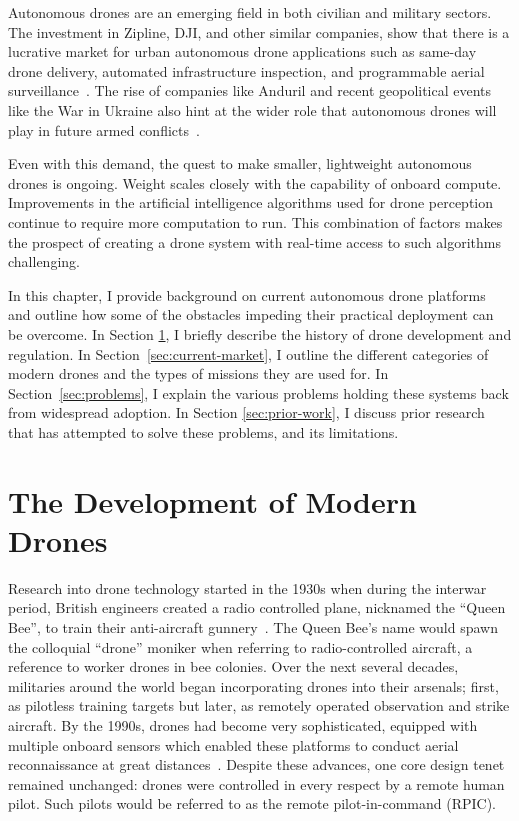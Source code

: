 Autonomous drones are an emerging field in both civilian and military sectors. The investment in Zipline, DJI, and other similar companies, show that there is a lucrative market for urban autonomous drone applications such as same-day drone delivery, automated infrastructure inspection, and programmable aerial surveillance~\cite{GrandviewResearchDroneMarket,ForbesZiplineEvaluation}. The rise of companies like Anduril and recent geopolitical events like the War in Ukraine also hint at the wider role that autonomous drones will play in future armed conflicts~\cite{CNBC,CFAS}.

Even with this demand, the quest to make smaller, lightweight autonomous drones is ongoing. Weight scales closely with the capability of onboard compute. Improvements in the artificial intelligence algorithms used for drone perception continue to require more computation to run. This combination of factors makes the prospect of creating a drone system with real-time access to such algorithms challenging.

In this chapter, I provide background on current autonomous drone platforms and outline how some of the obstacles impeding their practical deployment can be overcome. In Section \ref{sec:history-drone-development}, I briefly describe the history of drone development and regulation. In Section~\ref{sec:current-market}, I outline the different categories of modern drones and the types of missions they are used for. In Section~\ref{sec:problems}, I explain the various problems holding these systems back from widespread adoption. In Section \ref{sec:prior-work}, I discuss prior research that has attempted to solve these problems, and its limitations.

\section{The Development of Modern Drones}
\label{sec:history-drone-development}

Research into drone technology started in the 1930s when during the interwar period, British engineers created a radio controlled plane, nicknamed the ``Queen Bee'', to train their anti-aircraft gunnery~\cite{IWMDrone}. The Queen Bee's name would spawn the colloquial ``drone'' moniker when referring to radio-controlled aircraft, a reference to worker drones in bee colonies. Over the next several decades, militaries around the world began incorporating drones into their arsenals; first, as pilotless training targets but later, as remotely operated observation and strike aircraft. By the 1990s, drones had become very sophisticated, equipped with multiple onboard sensors which enabled these platforms to conduct aerial reconnaissance at great distances~\cite{GlobalHawk}. Despite these advances, one core design tenet remained unchanged: drones were controlled in every respect by a remote human pilot. Such pilots would be referred to as the remote pilot-in-command (RPIC).

